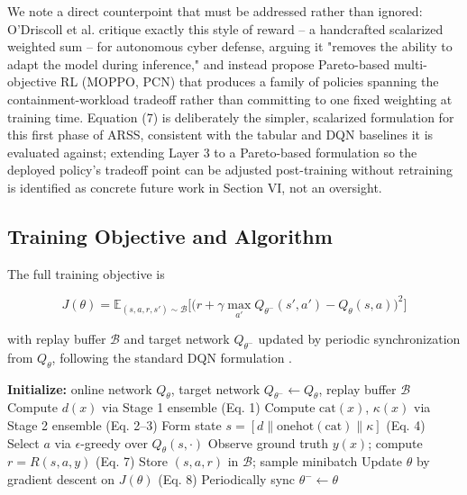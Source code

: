 \documentclass[conference]{IEEEtran}
\newcommand{\categ}{\text{cat}}
\newcommand{\danger}{d}
\newcommand{\conf}{\kappa}
\begin{document}
We note a direct counterpoint that must be addressed rather than ignored: O'Driscoll et al. \cite{modrl_cyberdefence} critique exactly this style of reward -- a handcrafted scalarized weighted sum -- for autonomous cyber defense, arguing it "removes the ability to adapt the model during inference," and instead propose Pareto-based multi-objective RL (MOPPO, PCN) that produces a family of policies spanning the containment-workload tradeoff rather than committing to one fixed weighting at training time. Equation (7) is deliberately the simpler, scalarized formulation for this first phase of ARSS, consistent with the tabular and DQN baselines it is evaluated against; extending Layer 3 to a Pareto-based formulation so the deployed policy's tradeoff point can be adjusted post-training without retraining is identified as concrete future work in Section VI, not an oversight.

\subsection{Training Objective and Algorithm}

The full training objective is

\begin{equation}
J(\theta) = \mathbb{E}_{(s,a,r,s') \sim \mathcal{B}} \Big[\big(r + \gamma \max_{a'} Q_{\theta^-}(s',a') - Q_\theta(s,a)\big)^2\Big]
\end{equation}

with replay buffer $\mathcal{B}$ and target network $Q_{\theta^-}$ updated by periodic synchronization from $Q_\theta$, following the standard DQN formulation \cite{mnih2015}.

\begin{algorithm}[H]
\caption{ARSS: Category-Conditioned DQN Training}
\begin{algorithmic}[1]
\STATE \textbf{Initialize:} online network $Q_\theta$, target network $Q_{\theta^-} \leftarrow Q_\theta$, replay buffer $\mathcal{B}$
    \STATE Compute $\danger(x)$ via Stage 1 ensemble (Eq. 1)
    \IF{$\danger(x) > \tau$}
        \STATE Compute $\categ(x)$, $\conf(x)$ via Stage 2 ensemble (Eq. 2--3)
        \STATE Form state $s = [\danger \| \text{onehot}(\categ) \| \conf]$ (Eq. 4)
        \STATE Select $a$ via $\epsilon$-greedy over $Q_\theta(s,\cdot)$
        \STATE Observe ground truth $y(x)$; compute $r = R(s,a,y)$ (Eq. 7)
        \STATE Store $(s,a,r)$ in $\mathcal{B}$; sample minibatch
        \STATE Update $\theta$ by gradient descent on $J(\theta)$ (Eq. 8)
        \STATE Periodically sync $\theta^- \leftarrow \theta$
    \ENDIF
\ENDFOR
\end{algorithmic}
\end{algorithm}
\end{document}

